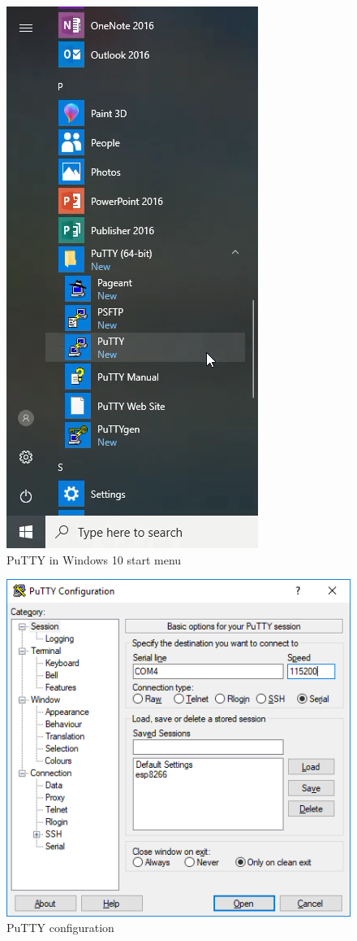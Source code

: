 \documentclass{book}
\makeatletter
\def\maxwidth{\ifdim\Gin@nat@width>\linewidth\linewidth
    \else\Gin@nat@width\fi}
\let\Oldincludegraphics\includegraphics
\renewcommand{\includegraphics}[1]{\Oldincludegraphics[width=.8\maxwidth]{#1}}
\makeatother
\begin{document}
\begin{figure}
\centering
\includegraphics{images/putty_in_start_menu.png}
\caption{PuTTY in Windows 10 start menu}
\end{figure}

\begin{figure}
\centering
\includegraphics{images/putty_config.PNG}
\caption{PuTTY configuration}
\end{figure}
\end{document}

